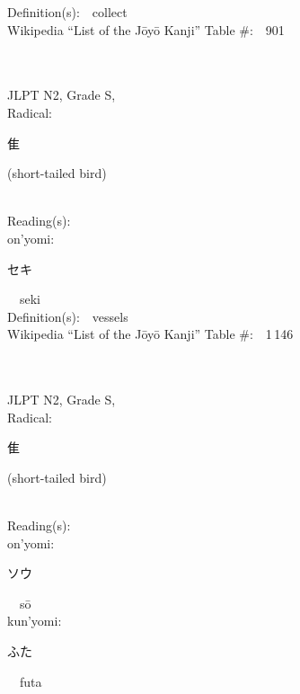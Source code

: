 \begin{multicols}{2}
Definition(s):\ \ collect \\
Wikipedia ``List of the J\=oy\=o Kanji'' Table \#:\ \ 901 \\
\ \ \\
{\fontsize{34pt}{40pt}  }\ \ \\  %
{JLPT N2, Grade S, \\Radical:\ \ {\begin{CJK}{UTF8}{min} 隹 \end{CJK}} (short-tailed bird) } \\
Reading(s):\ \ \\
{\hspace*{1em}}on'yomi:\ \ \\
{\hspace*{2em}}{\begin{CJK}{UTF8}{min} セキ \end{CJK}}\ \ seki\ \ \\
Definition(s):\ \ vessels \\
Wikipedia ``List of the J\=oy\=o Kanji'' Table \#:\ \ 1\,146 \\
\ \ \\
{\fontsize{34pt}{40pt}  }\ \ \\  %
{JLPT N2, Grade S, \\Radical:\ \ {\begin{CJK}{UTF8}{min} 隹 \end{CJK}} (short-tailed bird) } \\
Reading(s):\ \ \\
{\hspace*{1em}}on'yomi:\ \ \\
{\hspace*{2em}}{\begin{CJK}{UTF8}{min} ソウ \end{CJK}}\ \ s\=o\ \ \\
{\hspace*{1em}}kun'yomi:\ \ \\
{\hspace*{2em}}{\begin{CJK}{UTF8}{min} ふた \end{CJK}}\ \ futa\ \ \\

\end{multicols}
